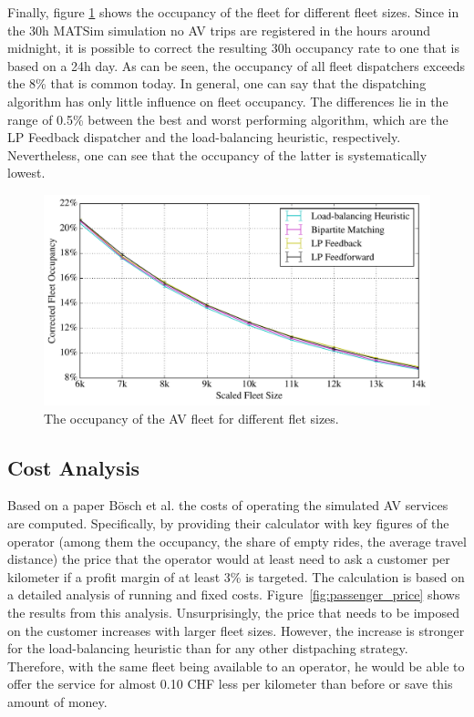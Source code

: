 Finally, figure \ref{fig:occupancy} shows the occupancy of the fleet for different
fleet sizes. Since in the 30h MATSim simulation no AV trips are registered in
the hours around midnight, it is possible to correct the resulting 30h occupancy
rate to one that is based on a 24h day. As can be seen, the occupancy of all
fleet dispatchers exceeds the 8\% that is common today. In general, one can say
that the dispatching algorithm has only little influence on fleet occupancy. The
differences lie in the range of 0.5\% between the best and worst performing algorithm,
which are the LP Feedback dispatcher and the load-balancing heuristic, respectively.
Nevertheless, one can see that the occupancy of the latter is systematically lowest.

\begin{figure}
\includegraphics[width=1.0\textwidth]{figures/occupancy.pdf}
\caption{The occupancy of the AV fleet for different flet sizes.}
\label{fig:occupancy}
\end{figure}

\subsection{Cost Analysis}
\label{sec:cost_analysis}

Based on a paper Bösch et al. \cite{cost_paper} the costs of operating the simulated
AV services are computed. Specifically, by providing their calculator with key
figures of the operator (among them the occupancy, the share of empty rides, the
average travel distance) the price that the operator would at least need to ask
a customer per kilometer if a profit margin of at least 3\% is targeted. The calculation
is based on a detailed analysis of running and fixed costs. Figure~\ref{fig:passenger_price}
shows the results from this analysis. Unsurprisingly, the price that needs to be
imposed on the customer increases with larger fleet sizes. However, the increase
is stronger for the load-balancing heuristic than for any other distpaching strategy.
Therefore, with the same fleet being available to an operator, he would be able
to offer the service for almost 0.10 CHF less per kilometer than before or save
this amount of money.

